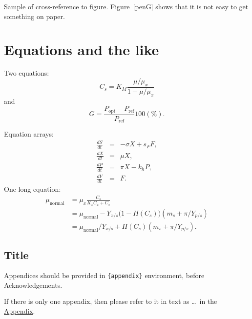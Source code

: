 \documentclass[aihp]{imsart}
\theoremstyle{plain}
\theoremstyle{remark}
\begin{document}
Sample of cross-reference to figure.
Figure~\ref{penG} shows that it is not easy to get something on paper.

\section{Equations and the like}

Two equations:
\begin{equation}
    C_{s}  =  K_{M} \frac{\mu/\mu_{x}}{1-\mu/\mu_{x}} \label{ccs}
\end{equation}
and
\begin{equation}
    G = \frac{P_{\mathrm{opt}} - P_{\mathrm{ref}}}{P_{\mathrm{ref}}}  100(\%).
\end{equation}

Equation arrays:
\begin{eqnarray}
  \frac{dS}{dt} & = & - \sigma X + s_{F} F,\\
  \frac{dX}{dt} & = &   \mu    X,\\
  \frac{dP}{dt} & = &   \pi    X - k_{h} P,\\
  \frac{dV}{dt} & = &   F.
\end{eqnarray}
One long equation:
\begin{equation}
\begin{aligned}
 \mu_{\text{normal}} & =  \mu_{x} \frac{C_{s}}{K_{x}C_{x}+C_{s}} \\
                     & =  \mu_{\text{normal}} - Y_{x/s}\bigl(1-H(C_{s})\bigr)(m_{s}+\pi /Y_{p/s})\\
                     & =  \mu_{\text{normal}}/Y_{x/s}+ H(C_{s}) (m_{s}+ \pi /Y_{p/s}).
\end{aligned}
\end{equation}
\begin{appendix}
\section*{Title}\label{appn} %
Appendices should be provided in \verb|{appendix}| environment,
before Acknowledgements.

If there is only one appendix,
then please refer to it in text as \ldots\ in the \hyperref[appn]{Appendix}.
\end{appendix}
\end{document}
